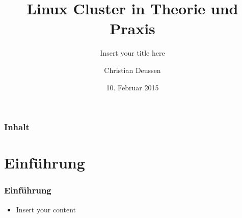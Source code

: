 \documentclass[10pt]{beamer}
\title{Linux Cluster in Theorie und Praxis}
\subtitle{Insert your title here}
\author{Christian Deussen}
\date{10. Februar 2015}
\institute[ZIH TUD]{Zentrum f\"ur Informationsdienste und Hochleistungsrechnen -- TU Dresden}
\begin{document}
\zihmaketitle

\begin{frame}
\frametitle{Inhalt}
 \tableofcontents
\end{frame}


\section{Einf\"uhrung}

\begin{frame}
	\frametitle{Einf\"uhrung}
	\begin{itemize}
		\item Insert your content
	\end{itemize}

\end{frame}
\end{document}

